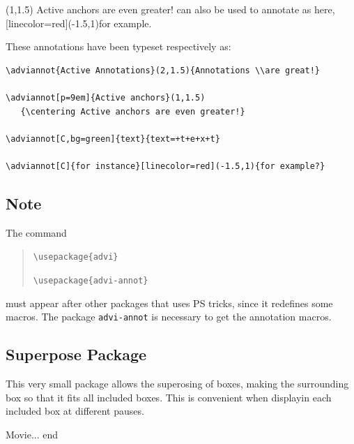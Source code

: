 \documentclass[12pt]{article}
\begin{document}
\noindent
{}(1,1.5)
{\centering Active anchors are even greater!}
can also be used to annotate  as
here, [linecolor=red](-1.5,1){for example}. 

\medskip

\noindent
These annotations have been typeset respectively as:
\begin{small}
\begin{verbatim}
\adviannot{Active Annotations}(2,1.5){Annotations \\are great!}

\adviannot[p=9em]{Active anchors}(1,1.5)
   {\centering Active anchors are even greater!}

\adviannot[C,bg=green]{text}{text=+t+e+x+t}

\adviannot[C]{for instance}[linecolor=red](-1.5,1){for example?}
\end{verbatim}
\end{small}

\subsection*{Note}

The command 
\begin{quote}

\verb"\usepackage{advi}"

\verb"\usepackage{advi-annot}"

\end{quote}
must appear after other packages that uses PS tricks, since it redefines
some macros.  The package \verb"advi-annot" is necessary to get
the annotation macros.

\newpage

\subsection*{Superpose Package}

This very small package allows the superosing of boxes, making the
surrounding box so that it fits all included boxes. This is convenient
when displayin each included box at different pauses.


Movie...
end
\adviwait{}
\adviwait{}
\end{document}
